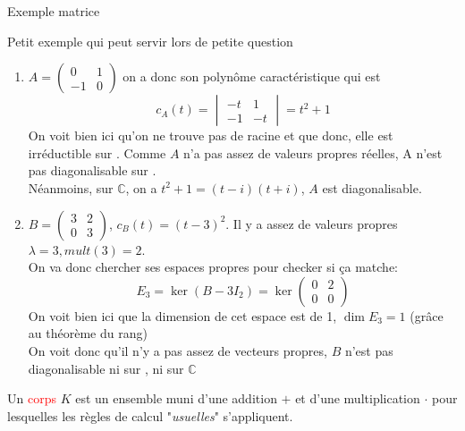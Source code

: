 \begin{parag}{Exemple matrice}
        \begin{subparag}{Petit exemple qui peut servir lors de petite question}
        \begin{enumerate}
            \item $A = \begin{pmatrix}
                0 & 1\\ -1 & 0
            \end{pmatrix}$ on a donc son polynôme caractéristique qui est 
            \[c_A(t) = \begin{vmatrix}
                -t & 1\\ -1 & -t
            \end{vmatrix} = t^2 + 1\]
            On voit bien ici qu'on ne trouve pas de racine et que donc, elle est irréductible sur \R. Comme $A$ n'a pas assez de valeurs propres réelles, A n'est pas diagonalisable sur \R.
            \\
            Néanmoins, sur $\mathbb{C}$, on a $t^2 + 1 = (t-i)(t+i)$, $A$ est diagonalisable.
            \item $B = \begin{pmatrix}
                3 & 2\\0 & 3
            \end{pmatrix}$, $c_B(t) = (t-3)^2$. Il y a assez de valeurs propres $\lambda = 3, mult(3) = 2$.
            \\
            On va donc chercher ses espaces propres pour checker si ça matche:
            \[E_3 =\ker(B - 3I_2) =  \ker \begin{pmatrix}
                0 & 2\\ 0 & 0
            \end{pmatrix}\]
            On voit bien ici que la dimension de cet espace est de 1, $\dim E_3 = 1$ (grâce au théorème du rang)\\
            On voit donc qu'il n'y a pas assez de vecteurs propres, $B$ n'est pas diagonalisable ni sur \R, ni sur $\mathbb{C}$
        \end{enumerate}
    
            
        \end{subparag}
\end{parag}        
    \begin{definition}
        Un \textcolor{red}{corps} $K$ est un ensemble muni d'une addition $+$ et d'une multiplication $\cdot$ pour lesquelles les règles de calcul "\textit{usuelles}" s'appliquent.
    \end{definition}
